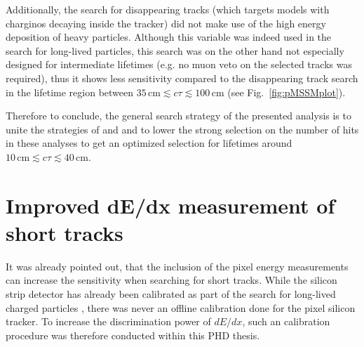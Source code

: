 Additionally, the search for disappearing tracks (which targets models with charginos decaying inside the tracker) did not make use of the high energy deposition of heavy particles. 
Although this variable was indeed used in the search for long-lived particles, this search was on the other hand not especially designed for intermediate lifetimes (e.g. no muon veto on the selected tracks was required), 
thus it shows less sensitivity compared to the disappearing track search in the lifetime region between $35\,\text{cm} \lesssim c\tau \lesssim 100\,\text{cm}$ (see Fig.~\ref{fig:pMSSMplot}).

Therefore to conclude, the general search strategy of the presented analysis is to unite the strategies of \cite{bib:CMS:HSCP_8TeV} and \cite{bib:CMS:DT_8TeV} and to lower the strong selection on the number of hits in these analyses 
to get an optimized selection for lifetimes around $10\,\text{cm} \lesssim c\tau \lesssim  40\,\text{cm}$.

\chapter{Improved dE/dx measurement of short tracks}
\label{sec:DeDxMeasurement}
It was already pointed out, that the inclusion of the pixel energy measurements can increase the sensitivity when searching for short tracks.
While the silicon strip detector has already been calibrated as part of the search for long-lived charged particles \cite{bib:CMS:HSCP_8TeV}, there was never an offline calibration done for the pixel silicon tracker.
To increase the discrimination power of $dE/dx$, such an calibration procedure was therefore conducted within this PHD thesis.
 
